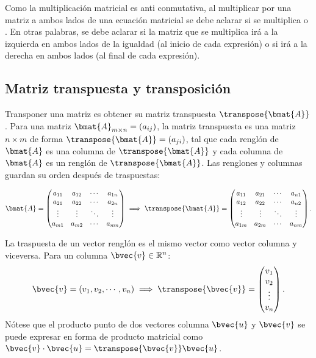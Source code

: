 \documentclass{fmbnotes}
\begin{document}
\begin{tip}
	Como la multiplicación matricial es anti conmutativa, al multiplicar por una matriz a ambos lados de una ecuación matricial se debe aclarar si se multiplica  o . En otras palabras, se debe aclarar si la matriz que se multiplica irá a la izquierda en ambos lados de la igualdad (al inicio de cada expresión) o si irá a la derecha en ambos lados (al final de cada expresión).
\end{tip}

\subsection{Matriz transpuesta y transposición}

Transponer una matriz es obtener su matriz transpuesta \(\transpose{\bmat{A}}\). Para una matriz \(\bmat{A}_{m \times n}=(a_{ij})\), la matriz transpuesta es una matriz \(n \times m\) de forma \(\transpose{\bmat{A}}=(a_{ji})\), tal que cada renglón de \( \bmat{A} \) es una columna de \(\transpose{\bmat{A}}\) y cada columna de \( \bmat{A} \) es un renglón de \(\transpose{\bmat{A}}\). Las renglones y columnas guardan su orden después de traspuestas:

\[\bmat{A}=\begin{pmatrix}
	a_{11} & a_{12} & \cdots & a_{1n} \\
	a_{21} & a_{22} & \cdots & a_{2n} \\
	\vdots & \vdots & \ddots & \vdots  \\
	a_{m1} & a_{m2} & \cdots & a_{mn} \\
\end{pmatrix} \implies \transpose{\bmat{A}}=
\begin{pmatrix}
		a_{11} & a_{21} & \cdots & a_{n1} \\
		a_{12} & a_{22} & \cdots & a_{n2} \\
		\vdots & \vdots & \ddots & \vdots  \\
		a_{1m} & a_{2m} & \cdots & a_{nm} 
\end{pmatrix}.\]
		
 La traspuesta de un vector renglón es el mismo vector como vector columna y viceversa. Para un columna  \(\bvec{v} \in \mathbb{R}^{n} \):
\[\bvec{v}=(v_1,v_2,\cdots,v_n) \implies \transpose{\bvec{v}}=\begin{pmatrix}
v_1 \\ v_2 \\ \vdots \\ v_n
\end{pmatrix}.\]
Nótese que el producto punto de dos vectores columna \(\bvec{u}\) y \(\bvec{v}\) se puede expresar en forma de producto matricial como \(\bvec{v} \cdot \bvec{u}=\transpose{\bvec{v}}\bvec{u}\).
\end{document}
